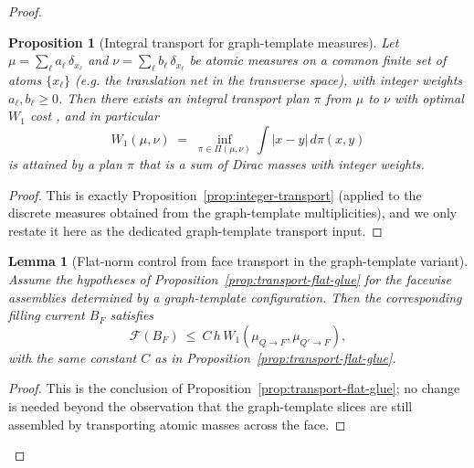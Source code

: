 \documentclass[11pt]{article}
\newcommand{\REVMZ}[1]{\textcolor{teal}{#1}}  %
\numberwithin{equation}{section}  %
\theoremstyle{plain}
\newtheorem{lemma}[theorem]{Lemma}
\newtheorem{proposition}[theorem]{Proposition}
\theoremstyle{definition}
\theoremstyle{remark}
\begin{document}
\begin{proof}
%
\begin{proposition}[Integral transport for graph-template measures]\label{prop:graph-template-transport}
Let $\mu=\sum_{\ell} a_\ell\,\delta_{x_\ell}$ and $\nu=\sum_{\ell} b_\ell\,\delta_{x_\ell}$ be atomic measures on a common finite set of atoms
$\{x_\ell\}$ (e.g. the translation net in the transverse space), with integer weights $a_\ell,b_\ell\ge 0$.
Then there exists an \emph{integral} transport plan $\pi$ from $\mu$ to $\nu$ with optimal $W_1$ cost \REVMZ{\cite{Villani03}}, and in particular
\[
W_1(\mu,\nu)\;=\;\inf_{\pi\in\Pi(\mu,\nu)}\int |x-y|\,d\pi(x,y)
\]
is attained by a plan $\pi$ that is a sum of Dirac masses with integer weights.
\end{proposition}

\begin{proof}
This is exactly Proposition~\ref{prop:integer-transport} (applied to the discrete measures obtained from the graph-template multiplicities),
and we only restate it here as the dedicated graph-template transport input.
\end{proof}

%
\begin{lemma}[Flat-norm control from face transport in the graph-template variant]\label{lem:graph-template-flat-control}
Assume the hypotheses of Proposition~\ref{prop:transport-flat-glue} for the facewise assemblies determined by a graph-template configuration.
Then the corresponding filling current $B_F$ satisfies
\[
\mathcal F(B_F)\ \le\ C\,h\,W_1(\mu_{Q\to F},\mu_{Q'\to F}),
\]
with the same constant $C$ as in Proposition~\ref{prop:transport-flat-glue}.
\end{lemma}

\begin{proof}
This is the conclusion of Proposition~\ref{prop:transport-flat-glue}; no change is needed beyond the observation that the graph-template
slices are still assembled by transporting atomic masses across the face.
\end{proof}



\end{proof}
\end{document}
